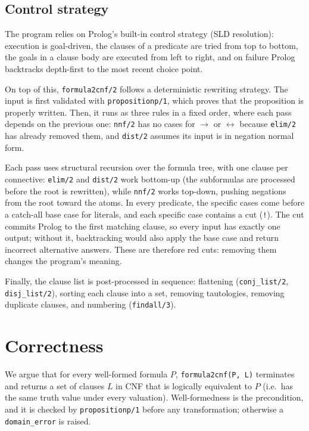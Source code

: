\documentclass[11pt]{article}
\begin{document}
\subsection*{Control strategy}

The program relies on Prolog's built-in control strategy (SLD resolution):
execution is goal-driven, the clauses of a predicate are tried from top to
bottom, the goals in a clause body are executed from left to right, and on
failure Prolog backtracks depth-first to the most recent choice point.

On top of this, \texttt{formula2cnf/2} follows a deterministic rewriting
strategy. The input is first validated with \texttt{propositionp/1}, which
proves that the proposition is properly written. Then, it runs as three rules in a fixed order,
where each pass depends on the previous one: \texttt{nnf/2} has no cases for
$\rightarrow$ or $\leftrightarrow$ because \texttt{elim/2} has already removed
them, and \texttt{dist/2} assumes its input is in negation normal form.

Each pass uses structural recursion over the formula tree, with one clause per
connective: \texttt{elim/2} and \texttt{dist/2} work bottom-up (the
subformulas are processed before the root is rewritten), while \texttt{nnf/2}
works top-down, pushing negations from the root toward the atoms. In every
predicate, the specific cases come before a catch-all base case for literals,
and each specific case contains a cut (\texttt{!}). The cut commits Prolog to
the first matching clause, so every input has exactly one output; without it,
backtracking would also apply the base case and return incorrect alternative
answers. These are therefore red cuts: removing them changes the program's
meaning.

Finally, the clause list is post-processed in sequence: flattening
(\texttt{conj\_list/2}, \texttt{disj\_list/2}), sorting each clause into a set,
removing tautologies, removing duplicate clauses, and numbering
(\texttt{findall/3}).

\section{Correctness}

We argue that for every well-formed formula $P$, \texttt{formula2cnf(P, L)}
terminates and returns a set of clauses $L$ in CNF that is logically
equivalent to $P$ (i.e.\ has the same truth value under every valuation).
Well-formedness is the precondition, and it is checked by \texttt{propositionp/1}
before any transformation; otherwise a \texttt{domain\_error} is raised.
\end{document}
